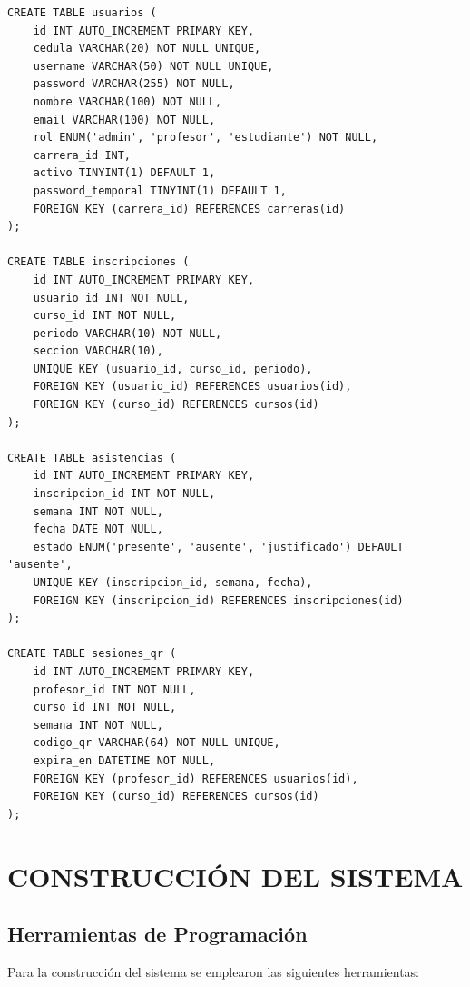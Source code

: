 \documentclass[12pt, letterpaper, oneside]{report}
\begin{document}
\begin{lstlisting}[caption=Fragmento del esquema de base de datos (\texttt{sql/schema.sql})]
CREATE TABLE usuarios (
    id INT AUTO_INCREMENT PRIMARY KEY,
    cedula VARCHAR(20) NOT NULL UNIQUE,
    username VARCHAR(50) NOT NULL UNIQUE,
    password VARCHAR(255) NOT NULL,
    nombre VARCHAR(100) NOT NULL,
    email VARCHAR(100) NOT NULL,
    rol ENUM('admin', 'profesor', 'estudiante') NOT NULL,
    carrera_id INT,
    activo TINYINT(1) DEFAULT 1,
    password_temporal TINYINT(1) DEFAULT 1,
    FOREIGN KEY (carrera_id) REFERENCES carreras(id)
);

CREATE TABLE inscripciones (
    id INT AUTO_INCREMENT PRIMARY KEY,
    usuario_id INT NOT NULL,
    curso_id INT NOT NULL,
    periodo VARCHAR(10) NOT NULL,
    seccion VARCHAR(10),
    UNIQUE KEY (usuario_id, curso_id, periodo),
    FOREIGN KEY (usuario_id) REFERENCES usuarios(id),
    FOREIGN KEY (curso_id) REFERENCES cursos(id)
);

CREATE TABLE asistencias (
    id INT AUTO_INCREMENT PRIMARY KEY,
    inscripcion_id INT NOT NULL,
    semana INT NOT NULL,
    fecha DATE NOT NULL,
    estado ENUM('presente', 'ausente', 'justificado') DEFAULT 'ausente',
    UNIQUE KEY (inscripcion_id, semana, fecha),
    FOREIGN KEY (inscripcion_id) REFERENCES inscripciones(id)
);

CREATE TABLE sesiones_qr (
    id INT AUTO_INCREMENT PRIMARY KEY,
    profesor_id INT NOT NULL,
    curso_id INT NOT NULL,
    semana INT NOT NULL,
    codigo_qr VARCHAR(64) NOT NULL UNIQUE,
    expira_en DATETIME NOT NULL,
    FOREIGN KEY (profesor_id) REFERENCES usuarios(id),
    FOREIGN KEY (curso_id) REFERENCES cursos(id)
);
\end{lstlisting}

\newpage

\chapter{CONSTRUCCI\'ON DEL SISTEMA}

\section{Herramientas de Programaci\'on}

Para la construcci\'on del sistema se emplearon las siguientes herramientas:
\end{document}
